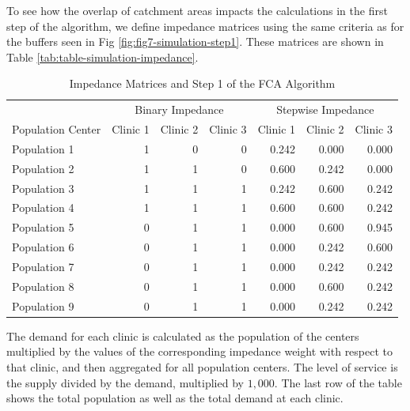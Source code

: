 \documentclass[10pt,letterpaper]{article}
\begin{document}
To see how the overlap of catchment areas impacts the calculations in
the first step of the algorithm, we define impedance matrices using the
same criteria as for the buffers seen in Fig
\ref{fig:fig7-simulation-step1}. These matrices are shown in Table
\ref{tab:table-simulation-impedance}.

\begin{table}[t]

\caption{\label{tab:table-simulation-impedance}\label{tab:table-simulation-step1-impedance}Impedance Matrices and Step 1 of the FCA Algorithm}
\centering
\fontsize{7}{9}\selectfont
\begin{tabular}{lrrrrrr}
\toprule
\multicolumn{1}{c}{ } & \multicolumn{3}{c}{Binary Impedance} & \multicolumn{3}{c}{Stepwise Impedance} \\
\cmidrule(l{2pt}r{2pt}){2-4} \cmidrule(l{2pt}r{2pt}){5-7}
Population Center & Clinic 1 & Clinic 2 & Clinic 3 & Clinic 1 & Clinic 2 & Clinic 3\\
\midrule
Population 1 & 1 & 0 & 0 & 0.242 & 0.000 & 0.000\\
Population 2 & 1 & 1 & 0 & 0.600 & 0.242 & 0.000\\
Population 3 & 1 & 1 & 1 & 0.242 & 0.600 & 0.242\\
Population 4 & 1 & 1 & 1 & 0.600 & 0.600 & 0.242\\
Population 5 & 0 & 1 & 1 & 0.000 & 0.600 & 0.945\\
\addlinespace
Population 6 & 0 & 1 & 1 & 0.000 & 0.242 & 0.600\\
Population 7 & 0 & 1 & 1 & 0.000 & 0.242 & 0.242\\
Population 8 & 0 & 1 & 1 & 0.000 & 0.600 & 0.242\\
Population 9 & 0 & 1 & 1 & 0.000 & 0.242 & 0.242\\
\bottomrule
\end{tabular}
\end{table}

The demand for each clinic is calculated as the population of the
centers multiplied by the values of the corresponding impedance weight
with respect to that clinic, and then aggregated for all population
centers. The level of service is the supply divided by the demand,
multiplied by \(1,000\). The last row of the table shows the total
population as well as the total demand at each clinic.
\end{document}
